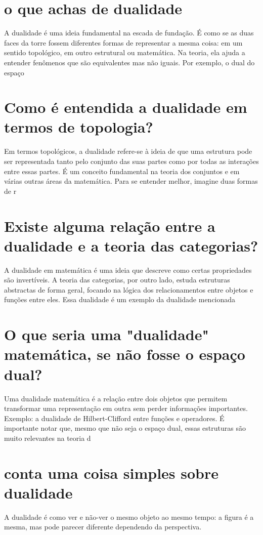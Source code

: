 \documentclass[11pt,a4paper]{article}
\begin{document}
\section{o que achas de dualidade}
A dualidade é uma ideia fundamental na escada de fundação. É como se as duas faces da torre fossem diferentes formas de representar a mesma coisa: em um sentido topológico, em outro estrutural ou matemática. Na teoria, ela ajuda a entender fenômenos que são equivalentes mas não iguais. Por exemplo, o dual do espaço

\section{Como é entendida a dualidade em termos de topologia?}
Em termos topológicos, a dualidade refere-se à ideia de que uma estrutura pode ser representada tanto pelo conjunto das suas partes como por todas as interações entre essas partes. É um conceito fundamental na teoria dos conjuntos e em várias outras áreas da matemática. Para se entender melhor, imagine duas formas de r

\section{Existe alguma relação entre a dualidade e a teoria das categorias?}
A dualidade em matemática é uma ideia que descreve como certas propriedades são invertíveis. A teoria das categorias, por outro lado, estuda estruturas abstractas de forma geral, focando na lógica dos relacionamentos entre objetos e funções entre eles. Essa dualidade é um exemplo da dualidade mencionada

\section{O que seria uma "dualidade" matemática, se não fosse o espaço dual?}
Uma dualidade matemática é a relação entre dois objetos que permitem transformar uma representação em outra sem perder informações importantes. Exemplo: a dualidade de Hilbert-Clifford entre funções e operadores. É importante notar que, mesmo que não seja o espaço dual, essas estruturas são muito relevantes na teoria d

\section{conta uma coisa simples sobre dualidade}
A dualidade é como ver e não-ver o mesmo objeto ao mesmo tempo: a figura é a mesma, mas pode parecer diferente dependendo da perspectiva.
\end{document}
